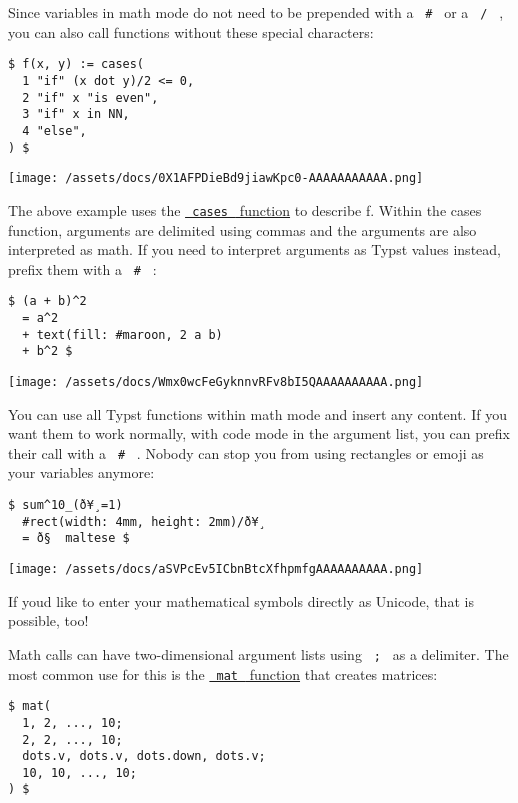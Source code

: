 Since variables in math mode do not need to be prepended with a
\texttt{\ \#\ } or a \texttt{\ /\ } , you can also call functions
without these special characters:

\begin{verbatim}
$ f(x, y) := cases(
  1 "if" (x dot y)/2 <= 0,
  2 "if" x "is even",
  3 "if" x in NN,
  4 "else",
) $
\end{verbatim}

\texttt{[image: /assets/docs/0X1AFPDieBd9jiawKpc0-AAAAAAAAAAA.png]}

The above example uses the
\href{/docs/reference/math/cases/}{\texttt{\ cases\ } function} to
describe f. Within the cases function, arguments are delimited using
commas and the arguments are also interpreted as math. If you need to
interpret arguments as Typst values instead, prefix them with a
\texttt{\ \#\ } :

\begin{verbatim}
$ (a + b)^2
  = a^2
  + text(fill: #maroon, 2 a b)
  + b^2 $
\end{verbatim}

\texttt{[image: /assets/docs/Wmx0wcFeGyknnvRFv8bI5QAAAAAAAAAA.png]}

You can use all Typst functions within math mode and insert any content.
If you want them to work normally, with code mode in the argument list,
you can prefix their call with a \texttt{\ \#\ } . Nobody can stop you
from using rectangles or emoji as your variables anymore:

\begin{verbatim}
$ sum^10_(ð¥¸=1)
  #rect(width: 4mm, height: 2mm)/ð¥¸
  = ð§  maltese $
\end{verbatim}

\texttt{[image: /assets/docs/aSVPcEv5ICbnBtcXfhpmfgAAAAAAAAAA.png]}

If you\textquotesingle d like to enter your mathematical symbols
directly as Unicode, that is possible, too!

Math calls can have two-dimensional argument lists using \texttt{\ ;\ }
as a delimiter. The most common use for this is the
\href{/docs/reference/math/mat/}{\texttt{\ mat\ } function} that creates
matrices:

\begin{verbatim}
$ mat(
  1, 2, ..., 10;
  2, 2, ..., 10;
  dots.v, dots.v, dots.down, dots.v;
  10, 10, ..., 10;
) $
\end{verbatim}

